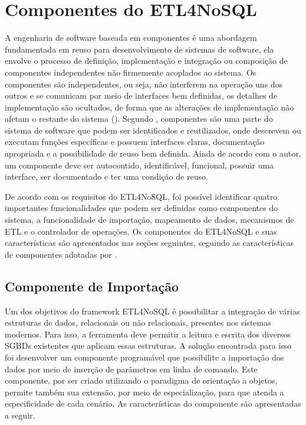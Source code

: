 


\section{Componentes do ETL4NoSQL}

A engenharia de software baseada em componentes é uma abordagem fundamentada em reuso para desenvolvimento de sistemas de software, ela envolve o processo de definição, implementação e integração ou composição de componentes independentes não firmemente acoplados ao sistema. Os componentes são independentes, ou seja, não interferem na operação uns dos outros e se comunicam por meio de interfaces bem definidas, os detalhes de implementação são ocultados, de forma que as alterações de implementação não afetam o restante do sistema (\cite{sommerville:2013}). Segundo \cite{sametinger:1997}, componentes são uma parte do sistema de software que podem ser identificados e reutilizados, onde descrevem ou executam funções específicas e possuem interfaces claras, documentação apropriada e a possibilidade de reuso bem definida. Ainda de acordo com o autor, um componente deve ser autocontido, identificável, funcional, possuir uma interface, ser documentado e ter uma condição de reuso. 

De acordo com os requisitos do ETL4NoSQL, foi possível identificar quatro importantes funcionalidades que podem ser definidas como componentes do sistema, a funcionalidade de importação, mapeamento de dados, mecanismos de ETL e o controlador de operações. Os componentes do ETL4NoSQL e suas características são apresentados nas seções seguintes, seguindo as características de componentes adotadas por \cite{heineman:2001}.


\subsection{Componente de Importação}

Um dos objetivos do framework ETL4NoSQL é possibilitar a integração de várias estruturas de dados, relacionais ou não relacionais, presentes nos sistemas modernos. Para isso, a ferramenta deve permitir a leitura e escrita dos diversos SGBDs existentes que aplicam essas estruturas. A solução encontrada para isso foi desenvolver um componente programável que possibilite a importação dos dados por meio de inserção de parâmetros em linha de comando. Este componente, por ser criado utilizando o paradigma de orientação a objetos, permite também sua extensão, por meio de especialização, para que atenda a especificidade de cada cenário. As características do componente são apresentadas a seguir.

